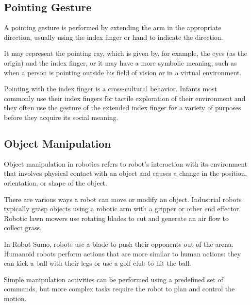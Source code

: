 \subsection{Pointing Gesture}
A pointing gesture is performed by extending the arm in the appropriate
direction, usually using the index finger or hand to indicate the direction.\par
It may represent the pointing ray, which is given by, for example,
the eyes (as the origin) and the index finger, or it may have a more symbolic
meaning, such as when a person is pointing outside his field of vision or in a virtual environment.\par
Pointing with the index finger is a cross-cultural behavior. Infants most commonly use their index fingers for tactile exploration of their environment and they often use the gesture of the extended
index finger for a variety of purposes before they acquire its social meaning.\cite{PAULUS2023} \par

\subsection{Object Manipulation}
Object manipulation in robotics refers to robot's interaction with its environment that involves physical contact with an object and causes a change in the position, orientation, or shape of the object.\par
There are various ways a robot can move or modify an object. Industrial robots typically grasp objects using a robotic arm with a gripper or other end effector. Robotic lawn mowers use rotating blades to cut and generate an air flow to collect grass.\par
In Robot Sumo, robots use a blade to push their opponents out of the arena. Humanoid robots perform actions that are more similar to human actions: they can kick a ball with their legs or use a golf club to hit the ball.\par

Simple manipulation activities can be performed using a predefined set of commands, but more complex tasks require the robot to plan and control the motion.\par


